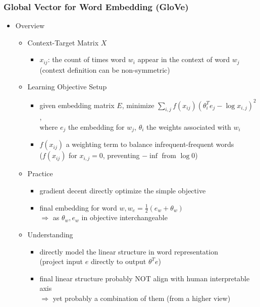 \subsubsection{Global Vector for Word Embedding (GloVe)} \label{DL_NLP_Langrep_GloVe}
\begin{itemize}
\item Overview
	\begin{itemize}
	\item Context-Target Matrix $X$
		\begin{itemize}
		\item $x_{ij}$: the count of times word $w_i$ appear in the context of word $w_j$ \\
		(context definition can be non-symmetric)
		\end{itemize}
	\item Learning Objective Setup
		\begin{itemize}
		\item given embedding matrix $E$, minimize $\sum_{i,j}f(x_{ij})(\theta_i^Te_j-\log x_{i,j})^2$, \\
		where $e_j$ the embedding for $w_j$, $\theta_i$ the weights associated with $w_i$
		\item $f(x_{ij})$ a weighting term to balance infrequent-frequent words \\
		($f(x_{ij})$ for $x_{i,j}=0$, preventing $-\inf$ from $\log0$)
		\end{itemize}
	\item Practice
		\begin{itemize}
		\item gradient decent directly optimize the simple objective
		\item final embedding for word $w, w_e = \frac 1 2 (e_w+\theta_w)$ \\
		$\Rightarrow$ as $\theta_w, e_w$ in objective interchangeable
		\end{itemize}
	\item Understanding
		\begin{itemize}
		\item directly model the linear structure in word representation \\ 
		(project input $e$ directly to output $\theta^T e$)
		\item final linear structure probably NOT align with human interpretable axis \\
		$\Rightarrow$ yet probably a combination of them (from a higher view)
		\end{itemize}
	\end{itemize}
\end{itemize}

